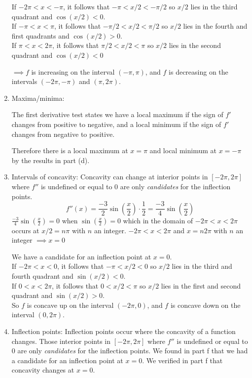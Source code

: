 \documentclass[nooutcomes,handout]{ximera}
\begin{document}
\begin{problem}
\begin{freeResponse}
\begin{enumerate}
        If $-2\pi <x< -\pi$, it follows that $-\pi<x/2<-\pi /2$ so $x/2$ lies in the third quadrant and $\cos(x/2)<0$. \\
         If $-\pi <x< \pi$, it follows that $-\pi /2<x/2<\pi /2$ so $x/2$ lies in the fourth and first quadrants and $\cos(x/2)>0$.  \\
         If $\pi <x< 2\pi$, it follows that $\pi /2<x/2<\pi$ so $x/2$ lies in the second quadrant and $\cos(x/2)<0$


         $\implies f$ is increasing on the interval $(-\pi, \pi)$, and $f$ is
        decreasing on the intervals $(-2\pi, -\pi)$ and $(\pi, 2\pi)$.
     
\item Maxima/minima:
 
      The first derivative test states
        we have a local maximum if the sign of $f'$ changes from
        positive to negative, and a local minimum if the sign of $f'$
        changes from negative to positive.

        Therefore there is a local maximum at $x = \pi$ and local
        minimum at $x = -\pi$ by the results in part (d).
        
        
     \item Intervals of concavity:
      Concavity can change at  interior points in $[-2\pi, 2\pi]$
            where $f''$ is undefined or equal to 0 are only
            \emph{candidates} for the inflection points.  
             \[
          f''(x) = \frac{-3}{2} \sin\left(\frac{x}{2}\right) \cdot
          \frac{1}{2} = \frac{-3}{4} \sin\left(\frac{x}{2}\right)
        \]
$\frac{-3}{4} \sin\left(\frac{x}{2}\right)=0$ when $\sin\left(\frac{x}{2}\right)=0$ which in the domain of $-2\pi < x < 2\pi$ occurs at $x/2 = n\pi$ with $n$ an integer.
$-2\pi < x < 2\pi$ and $x =  n2\pi$   with $n$ an integer $\implies x = 0$

We have a candidate for an inflection point at $x=0$. \\
 If $-2\pi <x< 0$, it follows that $-\pi<x/2<0$ so $x/2$ lies in the third and fourth quadrant and $\sin(x/2)<0$. \\
  If $0 <x<2 \pi$, it follows that $0<x/2<\pi$ so $x/2$ lies in the first and second quadrant and $\sin(x/2)>0$. \\


            So $f$ is concave up on the interval $(-2\pi, 0)$, and $f$
            is concave down on the interval $(0, 2\pi)$.   
    \item Inflection points: 
             Inflection points occur where the concavity of a
            function changes. Those interior points in $[-2\pi, 2\pi]$
            where $f''$ is undefined or equal to 0 are only
            \emph{candidates} for the inflection points.  We found in part f that we had a candidate for an inflection point at $x=0$.  We verified in part f that concavity changes at $x=0$.
            



\end{enumerate}
\end{freeResponse}
\end{problem}
\end{document}
